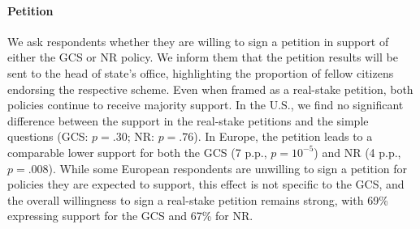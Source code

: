 \documentclass{nature}
\begin{document}
\begin{table} %
  \caption[List experiment: tacit support for the GCS]{Number of supported policies in the list experiment depending on the presence of the Global Climate Scheme (GCS) in the list.%
  }\label{tab:list_exp}
  \makebox[\textwidth][c]{
  }  
\end{table}

\paragraph{Petition}\label{subsubsec:petition}%

We ask respondents whether they are willing to sign a petition in support of either the GCS or NR policy. We inform them that the petition results will be sent to the head of state's office, highlighting the proportion of fellow citizens endorsing the respective scheme. Even when framed as a real-stake petition, both policies continue to receive majority support. In the U.S., we find no significant difference between the support in the real-stake petitions and the simple questions (GCS: $p=.30$; NR: $p=.76$). %
In Europe, the petition leads to a comparable lower support for both the GCS (7 p.p., $p=10^{-5}$) and NR (4 p.p., $p = .008$). While some European respondents are unwilling to sign a petition for policies they are expected to support, this effect is not specific to the GCS, and the overall willingness to sign a real-stake petition remains strong, with 69\% expressing support for the GCS and 67\% for NR.
\end{document}
